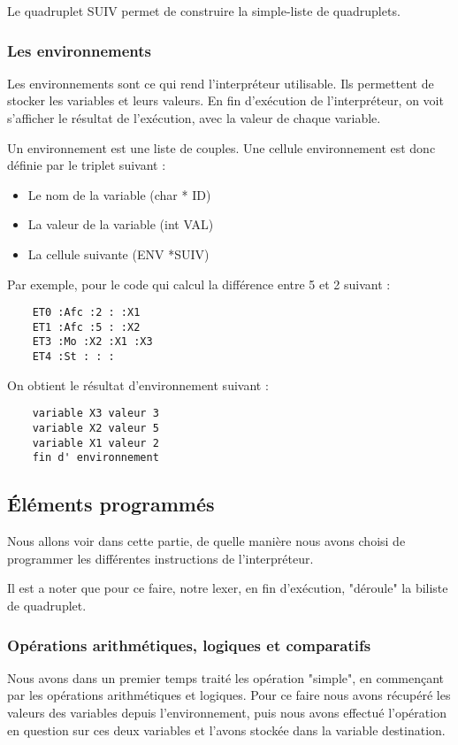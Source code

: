 \documentclass{article}
\begin{document}
Le quadruplet SUIV permet de construire la simple-liste de quadruplets.

\subsubsection{Les environnements}

Les environnements sont ce qui rend l’interpréteur utilisable. Ils permettent de stocker les variables et leurs valeurs.
En fin d’exécution de l'interpréteur, on voit s'afficher le résultat de l’exécution, avec la valeur de chaque variable.

Un environnement est une liste de couples. Une cellule environnement est donc définie par le triplet suivant :

\begin{itemize}
\item Le nom de la variable (char * ID)
\item La valeur de la variable (int VAL)
\item La cellule suivante (ENV *SUIV)
\end{itemize}

\bigbreak
Par exemple, pour le code qui calcul la différence entre 5 et 2 suivant :
\begin{lstlisting}
    ET0 :Afc :2 : :X1
    ET1 :Afc :5 : :X2
    ET3 :Mo :X2 :X1 :X3
    ET4 :St : : :
\end{lstlisting}

On obtient le résultat d'environnement suivant :

\begin{lstlisting}
    variable X3 valeur 3
    variable X2 valeur 5
    variable X1 valeur 2
    fin d' environnement
\end{lstlisting}


\subsection{Éléments programmés}

Nous allons voir dans cette partie, de quelle manière nous avons choisi de programmer les différentes instructions de l'interpréteur.

Il est a noter que pour ce faire, notre lexer, en fin d'exécution, "déroule" la biliste de quadruplet.
\subsubsection{Opérations arithmétiques, logiques et comparatifs}
Nous avons dans un premier temps traité les opération "simple", en commençant par les opérations arithmétiques et logiques.
Pour ce faire nous avons récupéré les valeurs des variables depuis l'environnement, puis nous avons effectué l'opération en question sur ces deux variables et l'avons stockée dans la variable destination.
\end{document}
